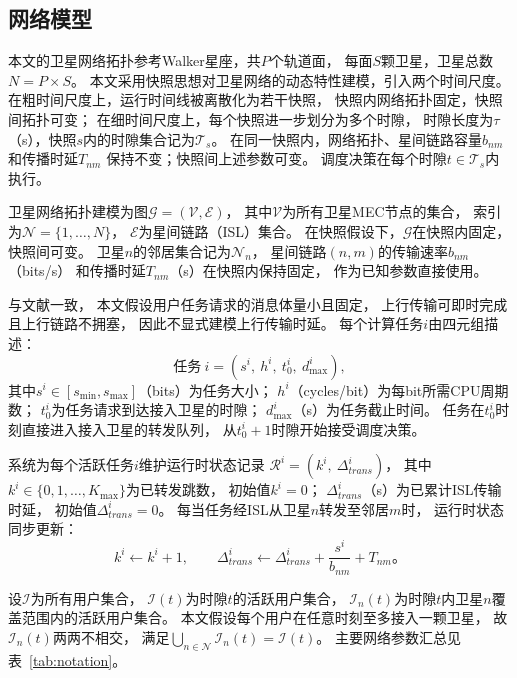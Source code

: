 \documentclass[a4paper,11pt]{article}
\begin{document}
\subsection{网络模型}

本文的卫星网络拓扑参考Walker星座，共$P$个轨道面，
每面$S$颗卫星，卫星总数$N = P \times S$。
本文采用快照思想对卫星网络的动态特性建模，引入两个时间尺度。
在粗时间尺度上，运行时间线被离散化为若干快照，
快照内网络拓扑固定，快照间拓扑可变；
在细时间尺度上，每个快照进一步划分为多个时隙，
时隙长度为$\tau$（s），快照$s$内的时隙集合记为$\mathcal{T}_s$。
在同一快照内，网络拓扑、星间链路容量$b_{nm}$和传播时延$T_{nm}$
保持不变；快照间上述参数可变。
调度决策在每个时隙$t \in \mathcal{T}_s$内执行。

卫星网络拓扑建模为图$\mathcal{G} = (\mathcal{V}, \mathcal{E})$，
其中$\mathcal{V}$为所有卫星MEC节点的集合，
索引为$\mathcal{N} = \{1, \ldots, N\}$，
$\mathcal{E}$为星间链路（ISL）集合。
在快照假设下，$\mathcal{G}$在快照内固定，快照间可变。
卫星$n$的邻居集合记为$\mathcal{N}_n$，
星间链路$(n,m)$的传输速率$b_{nm}$（bits/s）
和传播时延$T_{nm}$（s）在快照内保持固定，
作为已知参数直接使用。

与文献\cite{zhang2024mhspo}一致，
本文假设用户任务请求的消息体量小且固定，
上行传输可即时完成且上行链路不拥塞，
因此不显式建模上行传输时延。
每个计算任务$i$由四元组描述：
\begin{equation}
    \text{任务}~i = (s^i,~h^i,~t^i_0,~d^i_{\max}),
    \label{eq:task_tuple}
\end{equation}
其中$s^i \in [s_{\min}, s_{\max}]$（bits）为任务大小；
$h^i$（cycles/bit）为每bit所需CPU周期数；
$t^i_0$为任务请求到达接入卫星的时隙；
$d^i_{\max}$（s）为任务截止时间。
任务在$t^i_0$时刻直接进入接入卫星的转发队列，
从$t^i_0 + 1$时隙开始接受调度决策。

系统为每个活跃任务$i$维护运行时状态记录
$\mathcal{R}^i = (k^i,~\Delta^i_{trans})$，
其中$k^i \in \{0,1,\ldots,K_{\max}\}$为已转发跳数，
初始值$k^i=0$；
$\Delta^i_{trans}$（s）为已累计ISL传输时延，
初始值$\Delta^i_{trans}=0$。
每当任务经ISL从卫星$n$转发至邻居$m$时，
运行时状态同步更新：
\begin{equation}
    k^i \leftarrow k^i + 1,\qquad
    \Delta^i_{trans} \leftarrow \Delta^i_{trans}
    + \frac{s^i}{b_{nm}} + T_{nm}。
    \label{eq:runtime_update}
\end{equation}

设$\mathcal{I}$为所有用户集合，
$\mathcal{I}(t)$为时隙$t$的活跃用户集合，
$\mathcal{I}_n(t)$为时隙$t$内卫星$n$覆盖范围内的活跃用户集合。
本文假设每个用户在任意时刻至多接入一颗卫星，
故$\mathcal{I}_n(t)$两两不相交，
满足$\bigcup_{n \in \mathcal{N}} \mathcal{I}_n(t) = \mathcal{I}(t)$。
主要网络参数汇总见表~\ref{tab:notation}。
\end{document}
